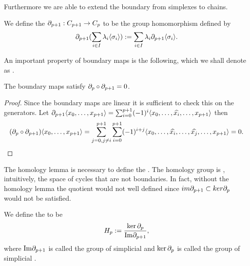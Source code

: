 \documentclass[../1.tex]{subfiles}
\begin{document}
    Furthermore we are able to extend the boundary from simplexes to chains.
    
    \begin{defn}
        We define the  $\partial_{p+1} : C_{p+1} \to C_p$ to be the group homomorphism defined by
        \[ \partial_{p+1}(\sum_{i \in I}\lambda_i\langle \sigma_i \rangle) := \sum_{i \in I}\lambda_i\partial_{p+1}\langle \sigma_i \rangle .\]
    \end{defn}

    An important property of boundary maps is the following, which we shall denote as .

    \begin{lem}
        The boundary maps satisfy $\partial_p \circ \partial_{p+1} = 0$.
    \end{lem}
    \begin{proof}
        Since the boundary maps are linear it is sufficient to check this on the generators.
        Let $\partial_{p+1}\langle x_0,\dots,x_{p+1} \rangle = \sum_{i=0}^{p+1} (-1)^i\langle x_0,\dots,\widehat{x_i},\dots,x_{p+1} \rangle$ then 
        \[(\partial_p \circ \partial_{p+1})\langle x_0,\dots,x_{p+1} \rangle = \sum_{j=0, j \neq i}^{p+1} \sum_{i=0}^{p+1} (-1)^{i+j}\langle x_0,\dots,\widehat{x_i},\dots,\widehat{x_j},\dots,x_{p+1} \rangle = 0. \qedhere \]     
    \end{proof}

    The homology lemma is necessary to define the .
    The homology group is , intuitively,  the space of cycles that are not boundaries. In fact, without the
    homology lemma the quotient would not well defined since $im\partial_{p+1} \subset ker\partial_p$ would not be satisfied.

    \begin{defn}
        We define the  to be 
        \[H_p := \frac{\ker\partial_p}{\mathrm{Im}\partial_{p+1}},\] 
        where $\mathrm{Im}\partial_{p+1}$ is called the group of simplicial  and
        $\ker\partial_p$ is called the group of simplicial .
    \end{defn}
\end{document}
